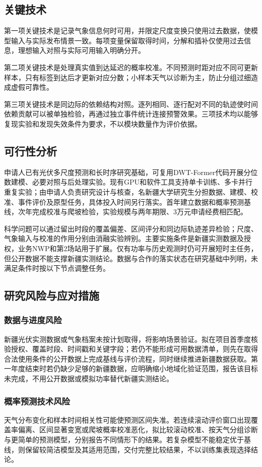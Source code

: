 \subsection{关键技术}
第一项关键技术是记录气象信息何时可用，并限定尺度变换只使用过去数据，使模型输入与实际发布情景一致。每项变量保留取得时间，分解和插补仅使用过去信息，理想输入对照与实际可用输入明确分开。

第二项关键技术是处理真实值到达延迟的概率校准。不同预测时距对应不同可更新样本，只有标签到达后才更新对应分数；小样本天气以诊断为主，防止分组过细造成虚假可靠性。

第三项关键技术是同边际的依赖结构对照。逐列相同、逐行配对不同的轨迹使时间依赖贡献可以被单独检验，再通过独立事件统计连接预警效果。三项技术均以能够复现实验和发现失效条件为要求，不以模块数量作为评价依据。

\subsection{可行性分析}
申请人已有光伏多尺度预测和长时序研究基础，可复用DWT-Former代码开展分位数建模、必要对照与后处理实验。现有GPU和软件工具支持单卡训练、多卡并行重复实验；由申请人负责研究设计与核查，名新疆大学研究生分担数据、建模、校准、事件评价及原型任务，具体投入时间另行落实。首年建立数据和概率预测基线，次年完成校准与爬坡检验，实验规模与两年期限、3万元申请经费相匹配。

科学问题可以通过留出时段的覆盖偏差、区间评分和同边际轨迹差异检验；尺度、气象输入与校准的作用分别由消融实验辨别。主要实施条件是新疆实测数据及授权，业务NWP和第2场站用于扩展。仅有功率与历史观测时仍可开展短时主任务，但公开数据不能支撑新疆实测结论。数据与合作的落实状态在研究基础中列明，未满足条件时按以下节点调整任务。

\subsection{研究风险与应对措施}
\subsubsection{数据与进度风险}
新疆光伏实测数据或气象档案未按计划取得，将影响场景验证。拟在项目首季度核验授权、覆盖时段、时间戳和关键字段；若仍不能形成可用数据清单，则先在取得合法使用条件的公开数据上完成基线与评价流程，同时继续推进新疆数据获取。第一年度结束时若仍缺少足够的新疆数据，应明确缩小地域化验证范围，报告该目标未完成，不用公开数据或模拟功率替代新疆实测结论。

\subsubsection{概率预测技术风险}
天气分布变化和样本时间相关性可能使预测区间失准。若连续滚动评价窗口出现覆盖率偏离、区间显著变宽或爬坡概率校准恶化，拟比较滚动校准、按天气分组诊断与更简单的预测模型，分别报告不同情形下的结果。若复杂模型不能稳定优于基线，则保留较简洁模型及其适用范围，交付完整比较结果，不以训练集表现选择结论。

